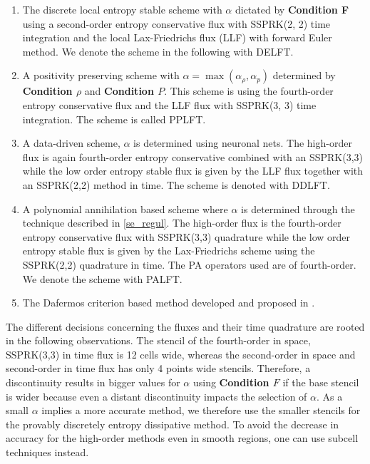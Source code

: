 \begin{enumerate}
	\item The discrete local entropy stable scheme with $\alpha$ dictated by \textbf{Condition F} using a second-order entropy conservative flux with SSPRK(2, 2) time integration and the local Lax-Friedrichs flux (LLF) with forward Euler method. We denote the scheme in the following with DELFT.
	\item A positivity preserving scheme with $\alpha = \max(\alpha_\rho, \alpha_p)$ determined by \textbf{Condition $\rho$} and \textbf{Condition $P$}. This scheme is using the fourth-order entropy conservative flux and  the LLF flux with SSPRK(3, 3) time integration. The scheme is called PPLFT. 
	\item A data-driven scheme, $\alpha$ is determined using  neuronal nets. The high-order flux is again fourth-order entropy conservative combined with an SSPRK(3,3) while the low order entropy stable flux is given by the  LLF flux together with an SSPRK(2,2) method in time.
The scheme is denoted with DDLFT. 
	\item A polynomial annihilation based scheme where $\alpha$ is determined through the technique described in \cref{se_regul}. The high-order flux is the fourth-order entropy conservative flux with SSPRK(3,3) quadrature while the low order entropy stable flux is given by the Lax-Friedrichs scheme using the SSPRK(2,2) quadrature in time. The PA operators used are of fourth-order. We denote the scheme with PALFT.
	\item The Dafermos criterion based method developed and proposed in \cite{klein2021using}.
\end{enumerate}
The different decisions concerning the fluxes and their time quadrature are rooted in the following observations. The stencil of the fourth-order in space, SSPRK(3,3) in time flux is 12  cells wide, whereas the second-order in space and second-order in time flux has only  4 points wide stencils. Therefore, a discontinuity results in bigger values for $\alpha$ using \textbf{Condition $F$} if the base stencil is wider because even a distant discontinuity impacts the selection of $\alpha$. As a small $\alpha$ implies a more accurate method, we therefore use the smaller stencils for the provably discretely entropy dissipative method.
To avoid the decrease in accuracy for the high-order methods even in smooth regions, one can use subcell techniques \cite{Harten1989ENO, rueda2022subcell} instead.  \\
